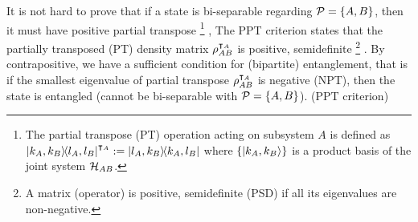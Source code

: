 \documentclass[
aps,
pra,
twocolumn,
floatfix,
]{revtex4-2}
\theoremstyle{plain}
\newtheorem{theorem}{Theorem}
\theoremstyle{definition}
\newcommand{\dm}{\rho}
\newcommand{\ppt}{\textup{PPT}}
\newcommand{\ppartition}{\mathcal{P}}
\begin{document}
It is not hard to prove that if a state is bi-separable regarding $\ppartition=\qty{A,B}$, then it must have positive partial transpose 
\footnote{
	The partial transpose (PT) operation acting on subsystem $A$ is defined as
	$\op{k_A,k_B}{l_A,l_B}^{\intercal_A} := \op{l_A,k_B}{k_A,l_B}$
	where $\qty{\ket{k_A,k_B}}$ is a product basis of the joint system $\mathcal{H}_{AB}$.
} , 
The PPT criterion states that the partially transposed (PT) density matrix $\dm_{AB}^{\T_A}$ is positive, semidefinite \footnote{A matrix (operator) is positive, semidefinite (PSD) if all its eigenvalues are non-negative.} \cite{peresSeparabilityCriterionDensity1996} \cite{horodeckiSeparabilityMixedStates1996}.
By contrapositive, we have a sufficient condition for (bipartite) entanglement, that is
	if the smallest eigenvalue of partial transpose $\dm_{AB}^{\T_A}$ is negative (NPT), then the state is entangled (cannot be bi-separable with $\ppartition=\qty{A,B}$).
		(PPT criterion)
\end{document}

